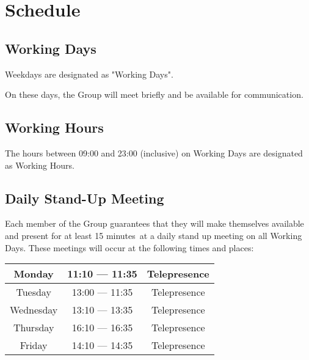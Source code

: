 \documentclass[a4paper,12pt]{article} %
\newcommand{\StandUpLength}{15 minutes}
\begin{document}


\section{Schedule}

\subsection{Working Days}

Weekdays are designated as "Working Days".

On these days, the Group will meet briefly and be available for communication.

\subsection{Working Hours}

The hours between 09:00 and 23:00 (inclusive)  on Working Days are designated as Working Hours.

\subsection{Daily Stand-Up Meeting} 
Each member of the Group guarantees that they will make themselves available and present for at least \StandUpLength~at a daily stand up meeting on all Working Days. These meetings will occur at the following times and places:

\begin{center}
\begin{tabular}{c | c | c |}
\hline
Monday & 11:10 --- 11:35 & Telepresence \\
\hline
Tuesday & 13:00 --- 11:35 & Telepresence \\
\hline
Wednesday & 13:10 --- 13:35 & Telepresence \\
\hline
Thursday & 16:10 --- 16:35 & Telepresence \\
\hline
Friday & 14:10 --- 14:35 & Telepresence\\
\hline
\end{tabular}
\end{center}
\end{document}
